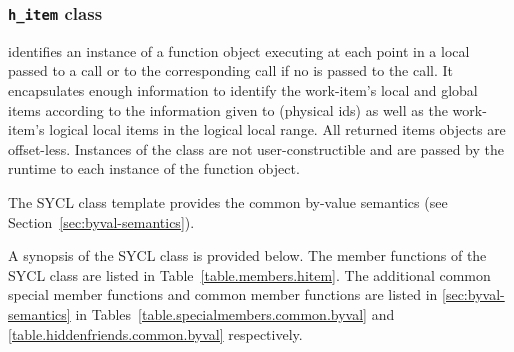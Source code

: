 
\subsubsection{\texttt{h_item} class}
\label{hitem-class}

 identifies an instance of a  function object
executing at each point in a local  passed to a 
call or to the corresponding  call if no 
is passed to the  call.
It encapsulates enough information to identify the \gls{work-item}'s local and global \glspl{item}
according to the information given to  (physical ids)
as well as the \gls{work-item}'s logical local \glspl{item} in the logical local range.
All returned \glspl{item} objects are offset-less.
Instances of the  class are not
user-constructible and are passed by the runtime to each instance of the
function object.

The SYCL  class template provides the common by-value
semantics (see Section~\ref{sec:byval-semantics}).

A synopsis of the SYCL  class is provided below. The member functions of the SYCL  class are listed in Table~\ref{table.members.hitem}. The additional common special member functions and common member functions are listed in \ref{sec:byval-semantics} in Tables~\ref{table.specialmembers.common.byval} and \ref{table.hiddenfriends.common.byval} respectively.



